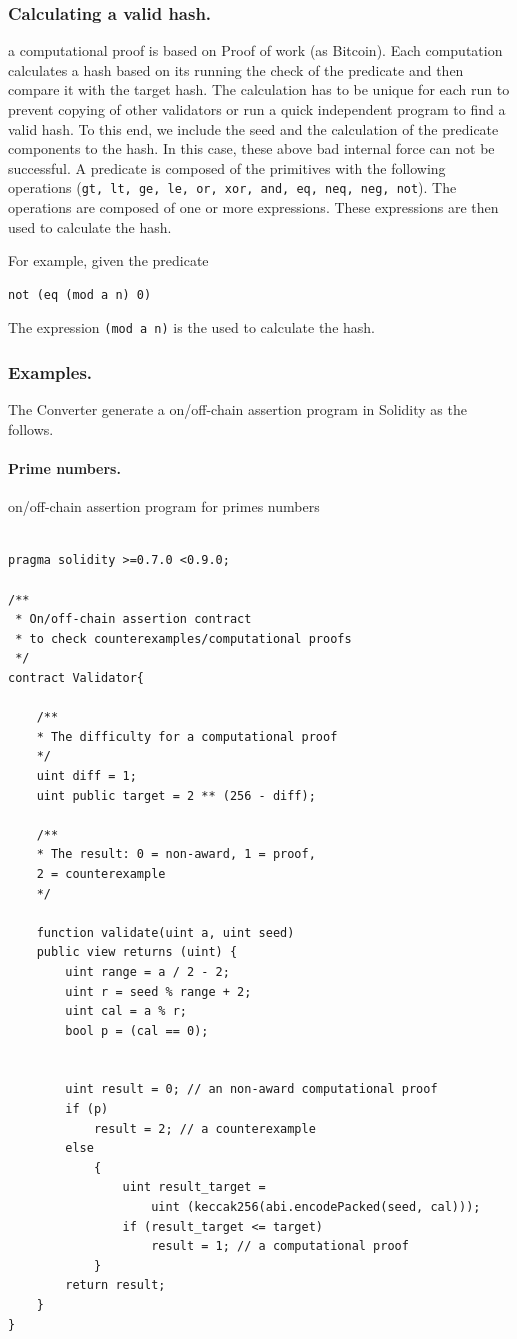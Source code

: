 \documentclass[runningheads]{llncs}
\begin{document}
\subsubsection{Calculating a valid hash.} a computational proof is based on Proof of work (as Bitcoin). Each computation calculates a hash based on its running the check of the predicate and then compare it with the target hash. The calculation has to be unique for each run to prevent copying of other validators or run a quick independent program to find a valid hash. To this end, we include the seed and the calculation of the predicate components to the hash. In this case, these above bad internal force can not be successful. A predicate is composed of the primitives with the following operations (\texttt{gt, lt, ge, le, or, xor, and, eq, neq, neg, not}). The operations are composed of one or more expressions. These expressions are then used to calculate the hash.

For example, given the predicate 

\begin{lstlisting}[numbers=none]
not (eq (mod a n) 0)
\end{lstlisting}

\noindent The expression \texttt{(mod a n)} is the used to calculate the hash.

\subsubsection{Examples.} The Converter generate a on/off-chain assertion program in Solidity as the follows.

\paragraph{Prime numbers.}{ on/off-chain assertion program for primes numbers}

\begin{lstlisting}[numbers=none]

pragma solidity >=0.7.0 <0.9.0;

/**
 * On/off-chain assertion contract 
 * to check counterexamples/computational proofs
 */
contract Validator{

    /**
    * The difficulty for a computational proof
    */
    uint diff = 1;
    uint public target = 2 ** (256 - diff); 

    /**
    * The result: 0 = non-award, 1 = proof, 
    2 = counterexample
    */

    function validate(uint a, uint seed) 
    public view returns (uint) {
        uint range = a / 2 - 2; 
        uint r = seed % range + 2;
        uint cal = a % r;
        bool p = (cal == 0);
        

        uint result = 0; // an non-award computational proof 
        if (p)  
            result = 2; // a counterexample
        else 
            {
                uint result_target = 
                    uint (keccak256(abi.encodePacked(seed, cal)));
                if (result_target <= target) 
                    result = 1; // a computational proof    
            }
        return result;           
    }
}

\end{lstlisting}
\end{document}
